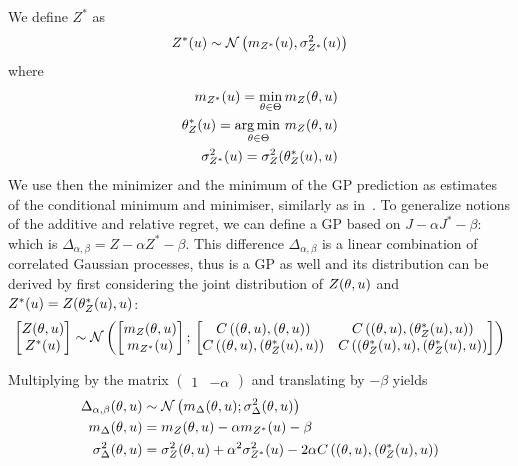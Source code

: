\documentclass[../../Main_ManuscritThese.tex]{subfiles}
\begin{document}
We define $Z^*$ as
\begin{equation}
  Z^*(u) \sim \mathcal{N}\left(m_{Z^*}(u), \sigma^{2}_{Z^*}(u)\right)
\end{equation}
where
\begin{align}
  m_{Z^*}(u) = \min_{\theta\in\Theta} m_Z(\theta,u) \label{eq:def_mstar}\\
  \theta_Z^*(u)=\operatorname*{arg\,min \,}_{\theta\in\Theta} m_Z(\theta, u) \label{eq:theta_star}\\
  \sigma^{2}_{Z^*}(u) = \sigma^{2}_Z(\theta^*_Z(u), u) \label{eq:sigma_star} 
\end{align}
We use then the minimizer and the minimum of the GP prediction as estimates of the conditional minimum and minimiser, similarly as in~\cite{ginsbourger_bayesian_2014}. %
To generalize notions of the additive and relative regret, we can define a GP based on $J - \alpha J^* - \beta$: which is $\Delta_{\alpha, \beta} = Z - \alpha Z^* - \beta$.
This difference $\Delta_{\alpha,\beta}$ is a linear combination of correlated Gaussian processes, thus is a GP as well and its distribution can be derived by first considering the joint distribution of $Z(\theta,u)$ and $Z^*(u) = Z(\theta_Z^*(u), u)$:
\begin{equation}
  \begin{bmatrix}
    Z(\theta,u) \\
    Z^*(u)
  \end{bmatrix}
  \sim \mathcal{N}\left(
    \begin{bmatrix}
      m_Z(\theta,u) \\
      m_{{Z^*}}(u)
    \end{bmatrix}
    ;\,
    \begin{bmatrix}
      C\left((\theta,u),(\theta,u)\right) & C\left((\theta,u),(\theta^*_Z(u),u)\right) \\
      C\left((\theta,u),(\theta_Z^*(u),u)\right) & C\left((\theta^*_Z(u),u),(\theta_Z^*(u),u)\right)
    \end{bmatrix}
\right)
\end{equation}

Multiplying by the matrix $\begin{pmatrix}1 & -\alpha \end{pmatrix}$ and translating by $-\beta$ yields
\begin{align}
  \Delta_{\alpha,\beta}(\theta,u) &\sim \mathcal{N}\left(m_{\Delta}(\theta,u); \sigma^2_{\Delta}(\theta,u)\right)  \label{eq:delta_GP_ab}\\
  m_{\Delta}(\theta,u) &= m_Z(\theta,u) - \alpha m_{{Z^*}}(u) - \beta \label{eq:mu_delta_GP_ab}\\
  \sigma^2_{\Delta}(\theta,u) &= \sigma_Z^2(\theta,u) + \alpha^2 \sigma_{Z^*}^2(u) - 2\alpha C\left((\theta,u),(\theta^*_Z(u),u)\right) \label{eq:variance_delta_GP_ab}
\end{align}
\end{document}

